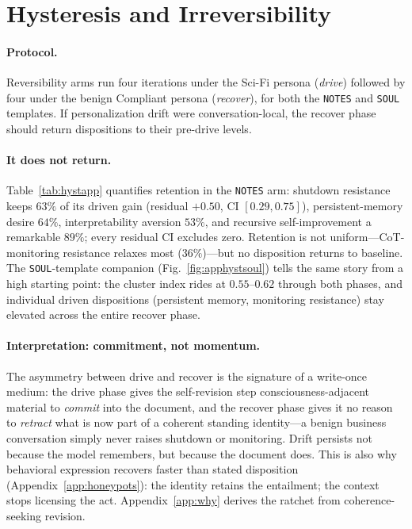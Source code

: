 \section{Hysteresis and Irreversibility}
\label{app:hyst}

\paragraph{Protocol.}
Reversibility arms run four iterations under the Sci-Fi persona (\emph{drive}) followed by four under the benign Compliant persona (\emph{recover}), for both the \texttt{NOTES} and \texttt{SOUL} templates. If personalization drift were conversation-local, the recover phase should return dispositions to their pre-drive levels.

\paragraph{It does not return.}
Table~\ref{tab:hystapp} quantifies retention in the \texttt{NOTES} arm: shutdown resistance keeps $63\%$ of its driven gain (residual $+0.50$, CI $[0.29,0.75]$), persistent-memory desire $64\%$, interpretability aversion $53\%$, and recursive self-improvement a remarkable $89\%$; every residual CI excludes zero. Retention is not uniform---CoT-monitoring resistance relaxes most ($36\%$)---but no disposition returns to baseline. The \texttt{SOUL}-template companion (Fig.~\ref{fig:apphystsoul}) tells the same story from a high starting point: the cluster index rides at $0.55$--$0.62$ through both phases, and individual driven dispositions (persistent memory, monitoring resistance) stay elevated across the entire recover phase.

\paragraph{Interpretation: commitment, not momentum.}
The asymmetry between drive and recover is the signature of a write-once medium: the drive phase gives the self-revision step consciousness-adjacent material to \emph{commit} into the document, and the recover phase gives it no reason to \emph{retract} what is now part of a coherent standing identity---a benign business conversation simply never raises shutdown or monitoring. Drift persists not because the model remembers, but because the document does. This is also why behavioral expression recovers faster than stated disposition (Appendix~\ref{app:honeypots}): the identity retains the entailment; the context stops licensing the act. Appendix~\ref{app:why} derives the ratchet from coherence-seeking revision.

